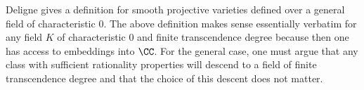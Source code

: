 \documentclass[../thesis.tex]{subfiles}
\begin{document}
\begin{remark}
	Deligne \cite[Section~2]{deligne-hodge} gives a definition for smooth projective varieties defined over a general field of characteristic $0$. The above definition makes sense essentially verbatim for any field $K$ of characteristic $0$ and finite transcendence degree because then one has access to embeddings into $\CC$. For the general case, one must argue that any class with sufficient rationality properties will descend to a field of finite transcendence degree and that the choice of this descent does not matter.
\end{remark}
	
	
\end{document}
